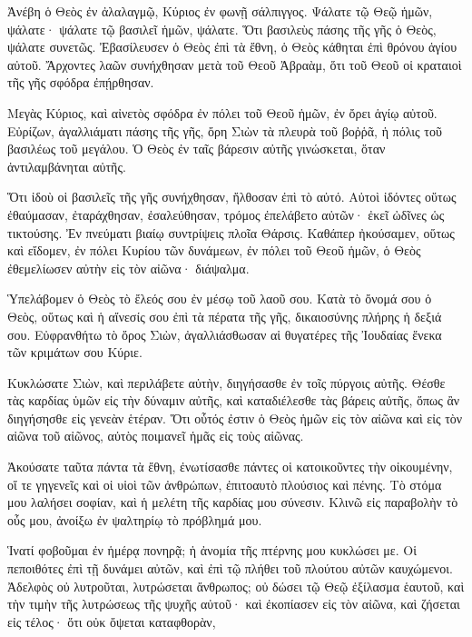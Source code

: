 \begin{spacing}{1.1}
\begin{multicols}{2}
Ἀνέβη ὁ Θεὸς ἐν ἀλαλαγμῷ, Κύριος ἐν φωνῇ σάλπιγγος.
Ψάλατε τῷ Θεῷ ἡμῶν, ψάλατε· ψάλατε τῷ βασιλεῖ ἡμῶν, ψάλατε.
Ὅτι βασιλεὺς πάσης τῆς γῆς ὁ Θεὸς, ψάλατε συνετῶς.
Ἐβασίλευσεν ὁ Θεὸς ἐπὶ τὰ ἔθνη, ὁ Θεὸς κάθηται ἐπὶ θρόνου ἁγίου αὐτοῦ.
Ἄρχοντες λαῶν συνήχθησαν μετὰ τοῦ Θεοῦ Ἀβραὰμ, ὅτι τοῦ Θεοῦ οἱ κραταιοὶ τῆς γῆς σφόδρα ἐπῄρθησαν.

Μεγὰς Κύριος, καὶ αἰνετὸς σφόδρα ἐν πόλει τοῦ Θεοῦ ἡμῶν, ἐν ὄρει ἁγίῳ αὐτοῦ.
Εὐρίζων, ἀγαλλιάματι πάσης τῆς γῆς, ὄρη Σιὼν τὰ πλευρὰ τοῦ βοῤῥᾶ, ἡ πόλις τοῦ βασιλέως τοῦ μεγάλου.
Ὁ Θεὸς ἐν ταῖς βάρεσιν αὐτῆς γινώσκεται, ὅταν ἀντιλαμβάνηται αὐτῆς.

Ὅτι ἰδοὺ οἱ βασιλεῖς τῆς γῆς συνήχθησαν, ἤλθοσαν ἐπὶ τὸ αὐτό.
Αὐτοὶ ἰδόντες οὕτως ἐθαύμασαν, ἐταράχθησαν, ἐσαλεύθησαν,
τρόμος ἐπελάβετο αὐτῶν· ἐκεῖ ὠδῖνες ὡς τικτούσης.
Ἐν πνεύματι βιαίῳ συντρίψεις πλοῖα Θάρσις.
Καθάπερ ἠκούσαμεν, οὕτως καὶ εἴδομεν, ἐν πόλει Κυρίου τῶν δυνάμεων, ἐν πόλει τοῦ Θεοῦ ἡμῶν, ὁ Θεὸς ἐθεμελίωσεν αὐτὴν εἰς τὸν αἰῶνα· διάψαλμα.

Ὑπελάβομεν ὁ Θεὸς τὸ ἔλεός σου ἐν μέσῳ τοῦ λαοῦ σου.
Κατὰ τὸ ὄνομά σου ὁ Θεὸς, οὕτως καὶ ἡ αἴνεσίς σου ἐπὶ τὰ πέρατα τῆς γῆς, δικαιοσύνης πλήρης ἡ δεξιά σου.
Εὐφρανθήτω τὸ ὄρος Σιὼν, ἀγαλλιάσθωσαν αἱ θυγατέρες τῆς Ἰουδαίας ἕνεκα τῶν κριμάτων σου Κύριε.

Κυκλώσατε Σιὼν, καὶ περιλάβετε αὐτὴν, διηγήσασθε ἐν τοῖς πύργοις αὐτῆς.
Θέσθε τὰς καρδίας ὑμῶν εἰς τὴν δύναμιν αὐτῆς, καὶ καταδιέλεσθε τὰς βάρεις αὐτῆς, ὅπως ἂν διηγήσησθε εἰς γενεὰν ἑτέραν.
Ὅτι οὗτός ἐστιν ὁ Θεὸς ἡμῶν εἰς τὸν αἰῶνα καὶ εἰς τὸν αἰῶνα τοῦ αἰῶνος, αὐτὸς ποιμανεῖ ἡμᾶς εἰς τοὺς αἰῶνας.

Ἀκούσατε ταῦτα πάντα τὰ ἔθνη, ἐνωτίσασθε πάντες οἱ κατοικοῦντες τὴν οἰκουμένην,
οἵ τε γηγενεῖς καὶ οἱ υἱοὶ τῶν ἀνθρώπων, ἐπιτοαυτὸ πλούσιος καὶ πένης.
Τὸ στόμα μου λαλήσει σοφίαν, καὶ ἡ μελέτη τῆς καρδίας μου σύνεσιν.
Κλινῶ εἰς παραβολὴν τὸ οὖς μου, ἀνοίξω ἐν ψαλτηρίῳ τὸ πρόβλημά μου.

Ἱνατί φοβοῦμαι ἐν ἡμέρᾳ πονηρᾷ; ἡ ἀνομία τῆς πτέρνης μου κυκλώσει με.
Οἱ πεποιθότες ἐπὶ τῇ δυνάμει αὐτῶν, καὶ ἐπὶ τῷ πλήθει τοῦ πλούτου αὐτῶν καυχώμενοι.
Ἀδελφὸς οὐ λυτροῦται, λυτρώσεται ἄνθρωπος; οὐ δώσει τῷ Θεῷ ἐξίλασμα ἑαυτοῦ,
καὶ τὴν τιμὴν τῆς λυτρώσεως τῆς ψυχῆς αὐτοῦ· καὶ ἐκοπίασεν εἰς τὸν αἰῶνα,
καὶ ζήσεται εἰς τέλος· ὅτι οὐκ ὄψεται καταφθορὰν,


\end{multicols}
\end{spacing}
